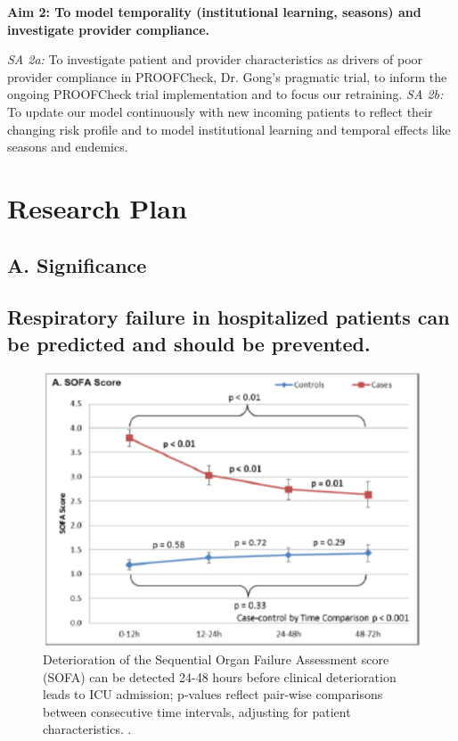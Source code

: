 \documentclass[11pt,notitlepage]{article}
\begin{document}
\begin{flushleft}
\textbf{Aim 2: To model temporality (institutional learning, seasons) and investigate provider compliance.}
\end{flushleft}
\vspace{-5pt}
\textit{SA 2a:} To investigate patient and provider characteristics as drivers of poor provider compliance in PROOFCheck, Dr. Gong's pragmatic trial, to inform the ongoing PROOFCheck trial implementation and to focus our retraining. 
\textit{SA 2b:} To update our model continuously with new incoming patients to reflect their changing risk profile and to model institutional learning and temporal effects like seasons and endemics. 
\section*{Research Plan}

\subsection*{A. Significance}



\subsection*{Respiratory failure in hospitalized patients can be predicted and should be prevented.} 

\begin{figure}
 \vspace{-10pt}
 \includegraphics[scale=0.7]{Figures/SOFA_fig.png}
  \vspace{-25pt}
  \caption{\footnotesize Deterioration of the Sequential Organ Failure Assessment score (SOFA) can be detected 24-48 hours before clinical deterioration leads to ICU admission; p-values reflect pair-wise comparisons between consecutive time intervals, adjusting for patient characteristics. \cite{Yu_24970344}.}
    \label{fig:SOFA_fig}
 \vspace{-15pt}
\end{figure}
\end{document}

